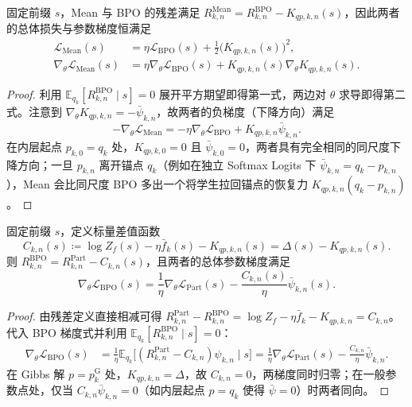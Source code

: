 \documentclass[lang=cn,scheme=chinese,openany]{elegantbook}
\begin{document}
\begin{proposition}
\label{prop:ch2-mean-bpo-gap}
固定前缀 $s$，Mean 与 BPO 的残差满足 $R_{k,n}^{\mathrm{Mean}}=R_{k,n}^{\mathrm{BPO}}-K_{qp,k,n}(s)$，因此两者的总体损失与参数梯度恒满足
\begin{align}
\mathcal L_{\mathrm{Mean}}(s)&=\eta\mathcal L_{\mathrm{BPO}}(s)+\frac12\bigl(K_{qp,k,n}(s)\bigr)^2,\\
\nabla_\theta\mathcal L_{\mathrm{Mean}}(s)&=\eta\nabla_\theta\mathcal L_{\mathrm{BPO}}(s)+K_{qp,k,n}(s)\nabla_\theta K_{qp,k,n}(s).
\label{eq:ch2-mean-bpo-gap}
\end{align}
\end{proposition}
\begin{proof}
利用 $\mathbb E_{ q_k}[R_{k,n}^{\mathrm{BPO}}\mid s]=0$ 展开平方期望即得第一式，两边对 $\theta$ 求导即得第二式。注意到 $\nabla_\theta K_{qp,k,n}=-\bar\psi_{k,n}$，故两者的负梯度（下降方向）满足
\begin{equation*}
-\nabla_\theta\mathcal L_{\mathrm{Mean}}
=-\eta\nabla_\theta\mathcal L_{\mathrm{BPO}}+K_{qp,k,n}\bar\psi_{k,n}.
\end{equation*}
在内层起点 $p_{k,0}=q_k$ 处，$K_{qp,k,0}=0$ 且 $\bar\psi_{k,0}=0$，两者具有完全相同的同尺度下降方向；一旦 $p_{k,n}$ 离开锚点 $q_k$（例如在独立 Softmax Logits 下 $\bar\psi_{k,n}=q_k-p_{k,n}$），Mean 会比同尺度 BPO 多出一个将学生拉回锚点的恢复力 $K_{qp,k,n}(q_k-p_{k,n})$。
\end{proof}

\begin{proposition}
\label{prop:ch2-bpo-part-gradient-gap}
固定前缀 $s$，定义标量差值函数
\begin{equation}
C_{k,n}(s)\coloneqq\log Z_f(s)-\eta\bar f_k(s)-K_{qp,k,n}(s)=\Delta(s)-K_{qp,k,n}(s).
\label{eq:ch2-bpo-part-qc}
\end{equation}
则 $R_{k,n}^{\mathrm{BPO}}=R_{k,n}^{\mathrm{Part}}-C_{k,n}(s)$，且两者的总体参数梯度满足
\begin{equation}
\nabla_\theta\mathcal L_{\mathrm{BPO}}(s)
=\frac1\eta\nabla_\theta\mathcal L_{\mathrm{Part}}(s)
-\frac{C_{k,n}(s)}\eta\bar\psi_{k,n}(s).
\label{eq:ch2-bpo-part-gradient-gap}
\end{equation}
\end{proposition}
\begin{proof}
由残差定义直接相减可得 $R_{k,n}^{\mathrm{Part}}-R_{k,n}^{\mathrm{BPO}}=\log Z_f-\eta\bar f_k-K_{qp,k,n}=C_{k,n}$。代入 BPO 梯度式并利用 $\mathbb E_{q_k}[R_{k,n}^{\mathrm{BPO}}\mid s]=0$：
\begin{align*}
\nabla_\theta\mathcal L_{\mathrm{BPO}}(s)
&=\frac1\eta\mathbb E_{ q_k}\bigl[(R_{k,n}^{\mathrm{Part}}-C_{k,n})\psi_{k,n}\mid s\bigr]
=\frac1\eta\nabla_\theta\mathcal L_{\mathrm{Part}}(s)-\frac{C_{k,n}}\eta\bar\psi_{k,n}.
\end{align*}
在 Gibbs 解 $p=p_k^{\mathrm G}$ 处，$K_{qp,k,n}=\Delta$，故 $C_{k,n}=0$，两梯度同时归零；在一般参数点处，仅当 $C_{k,n}\bar\psi_{k,n}=0$（如内层起点 $p=q_k$ 使得 $\bar\psi=0$）时两者同向。
\end{proof}
\end{document}
